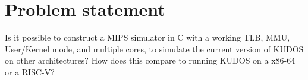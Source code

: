 \documentclass[11pt]{article}
\begin{document}

\clearpage\maketitle
\thispagestyle{empty}

\newpage

\section{Problem statement}
Is it possible to construct a MIPS simulator in C with a working TLB, MMU,
User/Kernel mode, and multiple cores, to simulate the current version of
KUDOS on other architectures?
How does this compare to running KUDOS on a x86-64 or a RISC-V?
\end{document}
